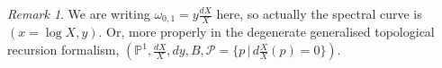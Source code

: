 \documentclass[10pt,a4paper,oneside,no-math,reqno]{amsart}%
\theoremstyle{plain}
\theoremstyle{definition}
\theoremstyle{remark}
\newtheorem{remark}[theorem]{Remark}
\numberwithin{equation}{section}
\newcommand{\mb}[1]{\mathbb{#1}}
\newcommand{\mc}[1]{\mathcal{#1}}
\newcommand{\1}{\mathds{1}}
\newcommand{\Z}{\mb{Z}}
\renewcommand{\P}{\mb{P}}
\newcommand{\<}{\langle}
\renewcommand{\>}{\rangle}
\newcommand{\del}{\partial}
\begin{document}




\begin{remark}
	We are writing $ \omega_{0,1} = y \frac{dX}{X}$ here, so actually the spectral curve is $ (x = \log X, y)$. Or, more properly in the degenerate generalised topological recursion formalism, $ ( \P^1, \frac{dX}{X}, dy, B, \mc{P} = \{ p \, | \, d\frac{X}{X}(p) = 0 \} )$.
\end{remark}
\end{document}
